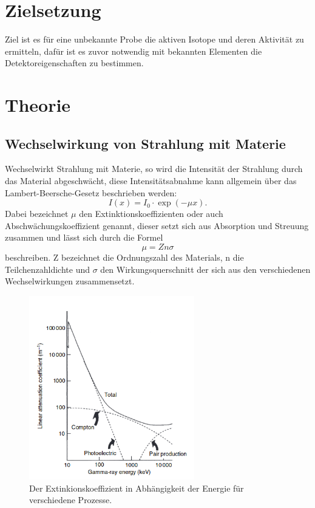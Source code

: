 \section{Zielsetzung}
Ziel ist es für eine unbekannte Probe die aktiven Isotope und deren Aktivität zu ermitteln,
dafür ist es zuvor notwendig mit bekannten Elementen die Detektoreigenschaften
zu bestimmen.

\section{Theorie}
\subsection{Wechselwirkung von Strahlung mit Materie}
Wechselwirkt Strahlung mit Materie, so wird die Intensität der Strahlung durch das Material
abgeschwächt, diese Intensitätsabnahme kann allgemein über das Lambert-Beersche-Gesetz beschrieben werden:
\begin{equation}
  I(x)=I_0\cdot\exp(-\mu x).
  \label{eqn:lambert}
\end{equation}
Dabei bezeichnet $\mu$ den Extinktionskoeffizienten oder auch Abschwächungskoeffizient genannt, dieser
setzt sich aus Absorption und Streuung zusammen und lässt sich durch die Formel
\begin{equation}
  \mu=Zn\sigma
\end{equation}
beschreiben. Z bezeichnet die Ordnungszahl des Materials, n die Teilchenzahldichte und $\sigma$ den
Wirkungsquerschnitt der sich aus den verschiedenen Wechselwirkungen zusammensetzt.
\begin{figure}[H]
  \centering
  \includegraphics[height=8cm]{Extin.png}
  \caption{Der Extinkionskoeffizient in Abhängigkeit der Energie für verschiedene Prozesse. \cite{Gilmore2}}
  \label{fig:Extin}
\end{figure}

